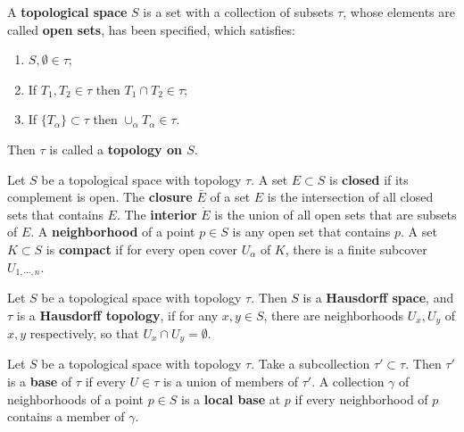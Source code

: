 \begin{defn} A \textbf{topological space} $S$ is a set with a collection of subsets $\tau$, whose elements are called \textbf{open sets}, has been specified, which satisfies:
\begin{enumerate}
\item $S,\emptyset\in \tau$;
\item If $T_1,T_2\in \tau$ then $T_1\cap T_2\in \tau$;
\item If $\{T_\alpha\}\subset \tau$ then $\cup_{\alpha}T_\alpha \in \tau$.
\end{enumerate}
Then $\tau$ is called a \textbf{topology on $S$}.
\end{defn}

\begin{defn} Let $S$ be a topological space with topology $\tau$. A set $E\subset S$ is \textbf{closed} if its complement is open. The \textbf{closure} $\bar{E}$ of a set $E$ is the intersection of all closed sets that contains $E$. The \textbf{interior} $\mathring{E}$ is the union of all open sets that are subsets of $E$. A \textbf{neighborhood} of a point $p\in S$ is any open set that contains $p$. A set $K\subset S$ is \textbf{compact} if for every open cover $U_\alpha$ of $K$, there is a finite subcover $U_{1,\cdots,n}$. 
\end{defn}

\begin{defn} Let $S$ be a topological space with topology $\tau$. Then $S$ is a \textbf{Hausdorff space}, and $\tau$ is a \textbf{Hausdorff topology}, if for any $x,y\in S$, there are neighborhoods $U_x,U_y$ of $x,y$ respectively, so that $U_x\cap U_y=\emptyset$.
\end{defn}

\begin{defn} Let $S$ be a topological space with topology $\tau$. Take a subcollection $\tau'\subset \tau$. Then $\tau'$ is a \textbf{base} of $\tau$ if every $U\in \tau$ is a union of members of $\tau'$. A collection $\gamma$ of neighborhoods of a point $p\in S$ is a \textbf{local base} at $p$ if every neighborhood of $p$ contains a member of $\gamma$.
\end{defn}

